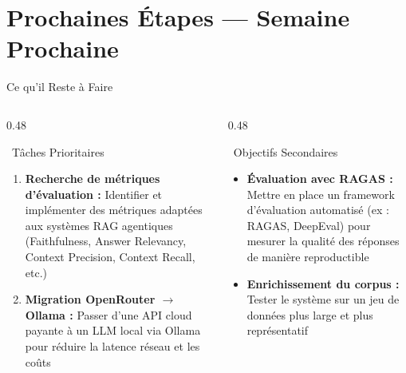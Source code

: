 \documentclass[aspectratio=169]{beamer}
\begin{document}

\section{Prochaines Étapes — Semaine Prochaine}

\begin{frame}{Ce qu'il Reste à Faire}
  \begin{columns}[T]
    \begin{column}{0.48\textwidth}
      \begin{exampleblock}{\faTasks\ Tâches Prioritaires}
        \small
        \begin{enumerate}
          \item \textbf{Recherche de métriques d'évaluation :} Identifier et implémenter des métriques adaptées aux systèmes RAG agentiques (Faithfulness, Answer Relevancy, Context Precision, Context Recall, etc.)
          \item \textbf{Migration OpenRouter $\to$ Ollama :} Passer d'une API cloud payante à un LLM local via Ollama pour réduire la latence réseau et les coûts
        \end{enumerate}
      \end{exampleblock}
    \end{column}
    \begin{column}{0.48\textwidth}
      \begin{alertblock}{\faBullseye\ Objectifs Secondaires}
        \small
        \begin{itemize}
          \item \textbf{Évaluation avec RAGAS :} Mettre en place un framework d'évaluation automatisé (ex : RAGAS, DeepEval) pour mesurer la qualité des réponses de manière reproductible
          \item \textbf{Enrichissement du corpus :} Tester le système sur un jeu de données plus large et plus représentatif
        \end{itemize}
      \end{alertblock}
    \end{column}
  \end{columns}
\end{frame}
\end{document}
